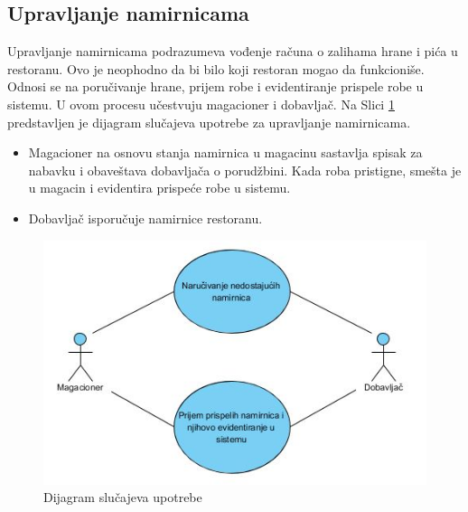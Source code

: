  \subsection{Upravljanje namirnicama}
 Upravljanje namirnicama podrazumeva vođenje računa o zalihama hrane i pića u restoranu. Ovo je neophodno da bi bilo koji restoran mogao da funkcioniše. Odnosi se na poručivanje hrane, prijem robe i evidentiranje prispele robe u sistemu. U ovom procesu učestvuju magacioner i dobavljač.
 Na Slici \ref{fig:slika_namir} predstavljen je dijagram slučajeva upotrebe za upravljanje namirnicama.
 
 \begin{itemize}
     \item Magacioner na osnovu stanja namirnica u magacinu sastavlja spisak za nabavku i obaveštava dobavljača o porudžbini. Kada roba pristigne, smešta je u magacin i evidentira prispeće robe u sistemu.
     \item Dobavljač isporučuje namirnice restoranu.
 \end{itemize}
\begin{figure}[!h]
    \leavevmode
    \begin{center}
    \includegraphics[width=1\textwidth]{slike/Upravljanje_namirnicama.JPG}
    \end{center}
    \caption{Dijagram slu\v cajeva upotrebe} %
    \label{fig:slika_namir}
\end{figure}

